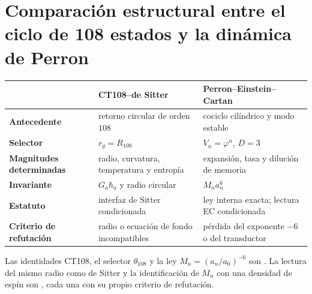 \section{Comparaci\'on estructural entre el ciclo de 108 estados y la din\'amica de Perron}

\begin{center}
\begin{tabularx}{\textwidth}{>{\bfseries}p{29mm}XX}
\toprule
& CT108--de Sitter & Perron--Einstein--Cartan\\
\midrule
Antecedente & retorno circular de orden \(108\) & cociclo cil\'indrico y modo estable\\
Selector & \(r_g=R_{108}\) & \(V_n=\varphi^n\), \(D=3\)\\
Magnitudes determinadas & radio, curvatura, temperatura y entrop\'ia & expansi\'on, tasa y diluci\'on de memoria\\
Invariante & \(G_a\hbar_a\) y radio circular & \(M_na_n^6\)\\
Estatuto & interfaz de Sitter condicionada & ley interna exacta; lectura EC condicionada\\
Criterio de refutación & radio o ecuaci\'on de fondo incompatibles & p\'erdida del exponente \(-6\) o del transductor\\
\bottomrule
\end{tabularx}
\end{center}

\begin{statusbox}
Las identidades CT108, el selector \(\theta_{108}\) y la ley
\(M_n=(a_n/a_0)^{-6}\) son . La lectura del mismo radio
como de Sitter y la identificaci\'on de \(M_n\) con una densidad de esp\'in son
, cada una con su propio criterio de refutación.
\end{statusbox}
